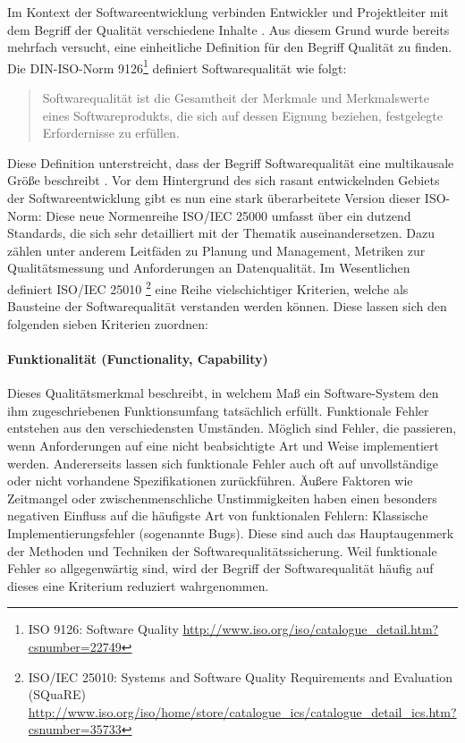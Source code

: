 Im Kontext der Softwareentwicklung verbinden Entwickler und Projektleiter mit dem Begriff der Qualität verschiedene Inhalte \cite{hoffmann_software-qualitat_2013}. Aus diesem Grund wurde bereits mehrfach versucht, eine einheitliche Definition für den Begriff Qualität zu finden. Die DIN-ISO-Norm 9126\footnote{ISO 9126: Software Quality \url{http://www.iso.org/iso/catalogue_detail.htm?csnumber=22749}} definiert Softwarequalität wie folgt:

\begin{quote}
Softwarequalität ist die Gesamtheit der Merkmale und Merkmalswerte eines Softwareprodukts, die sich auf dessen Eignung beziehen, festgelegte Erfordernisse zu erfüllen.
\end{quote}

Diese Definition unterstreicht, dass der Begriff Softwarequalität eine multikausale Größe beschreibt \cite{hoffmann_software-qualitat_2013}. Vor dem Hintergrund des sich rasant entwickelnden Gebiets der Softwareentwicklung gibt es nun eine stark überarbeitete Version dieser ISO-Norm: Diese neue Normenreihe ISO/IEC 25000 umfasst über ein dutzend Standards, die sich sehr detailliert mit der Thematik auseinandersetzen. Dazu zählen unter anderem Leitfäden zu Planung und Management, Metriken zur Qualitätsmessung und Anforderungen an Datenqualität. Im Wesentlichen definiert ISO/IEC 25010 \footnote{ISO/IEC 25010: Systems and Software Quality Requirements and Evaluation (SQuaRE) \url{http://www.iso.org/iso/home/store/catalogue_ics/catalogue_detail_ics.htm?csnumber=35733}} eine Reihe vielschichtiger Kriterien, welche als Bausteine der Softwarequalität verstanden werden können. Diese lassen sich den folgenden sieben Kriterien zuordnen:

\paragraph{Funktionalität (Functionality, Capability)} Dieses Qualitätsmerkmal beschreibt, in welchem Maß ein Software-System den ihm zugeschriebenen Funktionsumfang tatsächlich erfüllt. Funktionale Fehler entstehen aus den verschiedensten Umständen. Möglich sind Fehler, die passieren, wenn Anforderungen auf eine nicht beabsichtigte Art und Weise implementiert werden. Andererseits lassen sich funktionale Fehler auch oft auf unvollständige oder nicht vorhandene Spezifikationen zurückführen. Äußere Faktoren wie Zeitmangel oder zwischenmenschliche Unstimmigkeiten haben einen besonders negativen Einfluss auf die häufigste Art von funktionalen Fehlern: Klassische Implementierungsfehler (sogenannte \Glspl{Bug}). Diese sind auch das Hauptaugenmerk der Methoden und Techniken der Softwarequalitätssicherung. Weil funktionale Fehler so allgegenwärtig sind, wird der Begriff der Softwarequalität häufig auf dieses eine Kriterium reduziert wahrgenommen.

